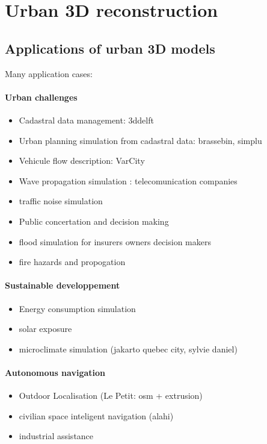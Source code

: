 \minitoc
\section{Urban 3D reconstruction}
    \subsection{Applications of urban 3D models}
        Many application cases:
        \paragraph{Urban challenges}
        \begin{itemize}
            \item Cadastral data management: 3ddelft
            \item Urban planning simulation from cadastral data: brassebin, simplu
            \item Vehicule flow description: VarCity
            \item Wave propagation simulation : telecomunication companies
            \item traffic noise simulation
            \item Public concertation and decision making
            \item flood simulation for insurers owners decision makers
            \item fire hazards and propogation
        \end{itemize}
        \paragraph{Sustainable developpement}
        \begin{itemize}
            \item Energy consumption simulation
            \item solar exposure
            \item microclimate simulation (jakarto quebec city, sylvie daniel)
        \end{itemize}
        \paragraph{Autonomous navigation}
        \begin{itemize}
            \item Outdoor Localisation (Le Petit: osm + extrusion)
            \item civilian space inteligent navigation (alahi)
            \item industrial assistance
        \end{itemize}

